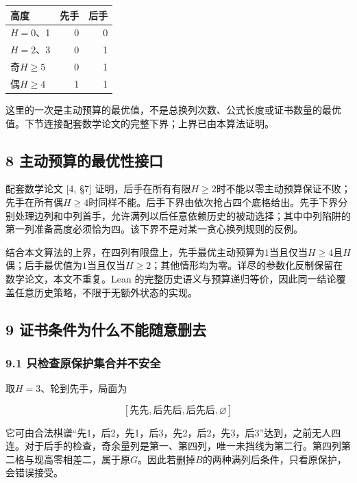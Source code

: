 \documentclass[
  a4paper,
]{article}
\newcounter{none} %
\begin{document}
{\def\LTcaptype{none} %
\begin{longtable}[]{@{}lrr@{}}
\toprule\noalign{}
高度 & 先手 & 后手 \\
\midrule\noalign{}
\endhead
\bottomrule\noalign{}
\endlastfoot
\(H=0\)、1 & 0 & 0 \\
\(H=2\)、3 & 0 & 1 \\
奇\(H\ge 5\) & 0 & 1 \\
偶\(H\ge 4\) & 1 & 1 \\
\end{longtable}
}

这里的一次是主动预算的最优值，不是总换列次数、公式长度或证书数量的最优值。下节连接配套数学论文的完整下界；上界已由本算法证明。

\subsection{8
主动预算的最优性接口}\label{ux4e3bux52a8ux9884ux7b97ux7684ux6700ux4f18ux6027ux63a5ux53e3}

配套数学论文 {[}4, §7{]}
证明，后手在所有有限\(H\ge2\)时不能以零主动预算保证不败；先手在所有偶\(H\ge4\)时同样不能。后手下界由依次抢占四个底格给出。先手下界分别处理边列和中列首手，允许满列以后任意依赖历史的被动选择；其中中列陷阱的第一列准备高度必须恰为四。该下界不是对某一贪心换列规则的反例。

结合本文算法的上界，在四列有限盘上，先手最优主动预算为\(1\)当且仅当\(H\ge4\)且\(H\)偶；后手最优值为\(1\)当且仅当\(H\ge2\)；其他情形均为零。详尽的参数化反制保留在数学论文，本文不重复。Lean
的完整历史语义与预算递归等价，因此同一结论覆盖任意历史策略，不限于无额外状态的实现。

\subsection{9
证书条件为什么不能随意删去}\label{ux8bc1ux4e66ux6761ux4ef6ux4e3aux4ec0ux4e48ux4e0dux80fdux968fux610fux5220ux53bb}

\subsubsection{9.1
只检查原保护集合并不安全}\label{ux53eaux68c0ux67e5ux539fux4fddux62a4ux96c6ux5408ux5e76ux4e0dux5b89ux5168}

取\(H=3\)、轮到先手，局面为

\[[\text{先先},\text{后先后},\text{后先后},\varnothing ]\]

它可由合法棋谱``先1，后2，先1，后3，先2，后2，先3，后3''达到，之前无人四连。对于后手的检查，奇余量列是第一、第四列，唯一未挡线为第二行。第四列第二格与现高零相差二，属于原\(G\)。因此若删掉\(B\)的两种满列后条件，只看原保护，会错误接受。
\end{document}
